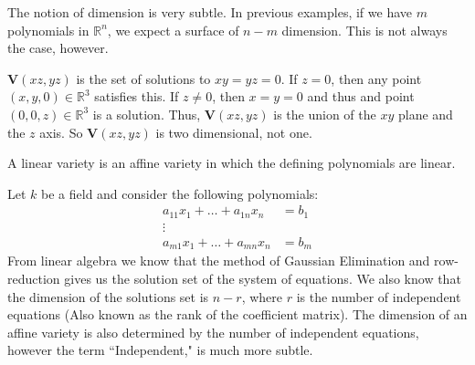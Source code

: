                 The notion of dimension is very subtle.
                In previous examples, if we have $m$ polynomials
                in $\mathbb{R}^n$, we expect a surface of $n-m$
                dimension. This is not always the case, however.
                \begin{example}
                    $\mathbf{V}(xz,yz)$ is the set of solutions
                    to $xy=yz=0$. If $z=0$, then any point
                    $(x,y,0)\in \mathbb{R}^3$ satisfies this.
                    If $z\ne 0$, then $x=y=0$ and thus and point
                    $(0,0,z)\in \mathbb{R}^3$ is a solution.
                    Thus, $\mathbf{V}(xz,yz)$ is the union of the $xy$
                    plane and the $z$ axis. So $\mathbf{V}(xz,yz)$
                    is two dimensional, not one.
                \end{example}
                \begin{definition}
                    A linear variety is an affine variety
                    in which the defining polynomials are linear.
                \end{definition}
                \begin{example}
                    Let $k$ be a field and consider
                    the following polynomials:
                    \begin{align*}
                        a_{11}x_{1}+\hdots+a_{1n}x_{n}
                        &=b_{1}\\
                        \vdots&\\
                        a_{m1}x_{1}+\hdots+a_{mn}x_{n}
                        &=b_{m}
                    \end{align*}
                    From linear algebra we know that the
                    method of Gaussian Elimination and
                    row-reduction gives us the solution set of the
                    system of equations. We also know that the
                    dimension of the solutions set is $n-r$, where $r$
                    is the number of independent equations
                    (Also known as the rank of the coefficient matrix).
                    The dimension of an affine variety is also
                    determined by the number of independent equations,
                    however the term ``Independent," is much more subtle.
                \end{example}
